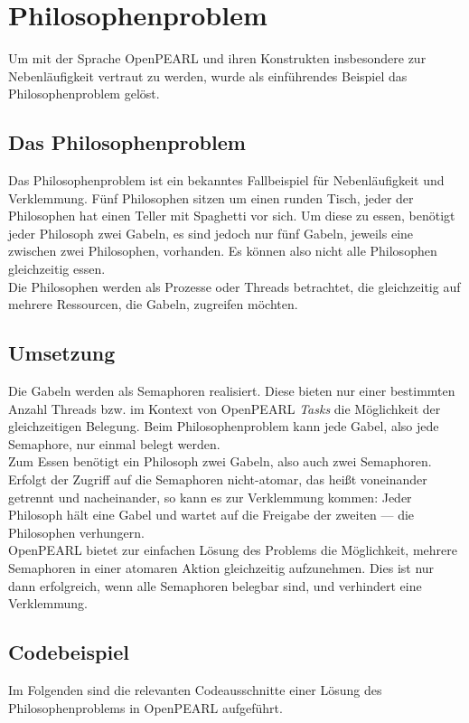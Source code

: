 \chapter{Philosophenproblem}

Um mit der Sprache OpenPEARL und ihren Konstrukten insbesondere zur Nebenläufigkeit vertraut zu werden, wurde als einführendes Beispiel das Philosophenproblem gelöst.

\section{Das Philosophenproblem}
	Das Philosophenproblem ist ein bekanntes Fallbeispiel für Nebenläufigkeit und Verklemmung. Fünf Philosophen sitzen um einen runden Tisch, jeder der Philosophen hat einen Teller mit Spaghetti vor sich. Um diese zu essen, benötigt jeder Philosoph zwei Gabeln, es sind jedoch nur fünf Gabeln, jeweils eine zwischen zwei Philosophen, vorhanden. Es können also nicht alle Philosophen gleichzeitig essen.\\
	Die Philosophen werden als Prozesse oder Threads betrachtet, die gleichzeitig auf mehrere Ressourcen, die Gabeln, zugreifen möchten.
	
\section{Umsetzung}
	Die Gabeln werden als Semaphoren realisiert. Diese bieten nur einer bestimmten Anzahl Threads bzw. im Kontext von OpenPEARL \emph{Tasks} die Möglichkeit der gleichzeitigen Belegung. Beim Philosophenproblem kann jede Gabel, also jede Semaphore, nur einmal belegt werden.\\
	Zum Essen benötigt ein Philosoph zwei Gabeln, also auch zwei Semaphoren. Erfolgt der Zugriff auf die Semaphoren nicht-atomar, das heißt voneinander getrennt und nacheinander, so kann es zur Verklemmung kommen: Jeder Philosoph hält eine Gabel und wartet auf die Freigabe der zweiten --- die Philosophen verhungern.\\
	OpenPEARL bietet zur einfachen Lösung des Problems die Möglichkeit, mehrere Semaphoren in einer atomaren Aktion gleichzeitig aufzunehmen. Dies ist nur dann erfolgreich, wenn alle Semaphoren belegbar sind, und verhindert eine Verklemmung.

\newpage

\section{Codebeispiel}
	Im Folgenden sind die relevanten Codeausschnitte einer Lösung des Philosophenproblems in OpenPEARL aufgeführt.
	
